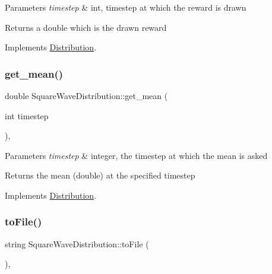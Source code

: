 \begin{DoxyParams}{Parameters}
{\em timestep} & int, timestep at which the reward is drawn \\
\hline
\end{DoxyParams}
\begin{DoxyReturn}{Returns}
a double which is the drawn reward 
\end{DoxyReturn}


Implements \mbox{\hyperlink{class_distribution_a742b398af4a461243028cce3c47d8080}{Distribution}}.

\mbox{\label{class_square_wave_distribution_ac2e790a852c02473e70e4ff5090cfc51}} 
\subsubsection{\texorpdfstring{get\+\_\+mean()}{get\_mean()}}
{\footnotesize\ttfamily double Square\+Wave\+Distribution\+::get\+\_\+mean (\begin{DoxyParamCaption}\item[{int}]{timestep }\end{DoxyParamCaption})\hspace{0.3cm}{\ttfamily [override]}, {\ttfamily [virtual]}}


\begin{DoxyParams}{Parameters}
{\em timestep} & integer, the timestep at which the mean is asked \\
\hline
\end{DoxyParams}
\begin{DoxyReturn}{Returns}
the mean (double) at the specified timestep 
\end{DoxyReturn}


Implements \mbox{\hyperlink{class_distribution_ac9c74d18549f532caa09ae86d8b25b55}{Distribution}}.

\mbox{\label{class_square_wave_distribution_a8ba3fbbf02f23f02697f34f841e9a870}} 
\subsubsection{\texorpdfstring{to\+File()}{toFile()}}
{\footnotesize\ttfamily string Square\+Wave\+Distribution\+::to\+File (\begin{DoxyParamCaption}{ }\end{DoxyParamCaption})\hspace{0.3cm}{\ttfamily [override]}, {\ttfamily [virtual]}}



